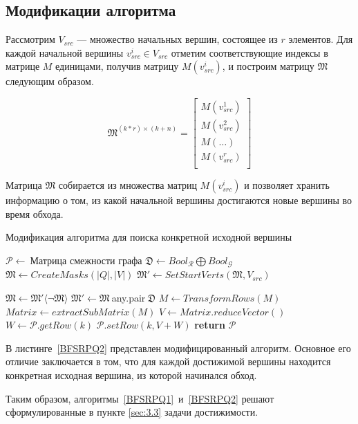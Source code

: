 \pagebreak

\subsection{Модификации алгоритма}

Рассмотрим $V_{src}$ --- множество начальных вершин, состоящее из $r$ элементов. Для каждой начальной вершины $v_{src}^i \in V_{src}$ отметим соответствующие индексы в матрице $M$ единицами, получив матрицу $M(v_{src}^i)$,  и построим матрицу $\mathfrak{M}$ следующим образом.

\begin{equation}
\mathfrak{M}^{(k*r) \times (k + n)} =
  \left[
    \begin{matrix}
        M(v_{src}^1) \\
        M(v_{src}^2) \\ 
        M(\dots) \\
        M(v_{src}^r) \\
    \end{matrix}
  \right]
\end{equation}

Матрица $\mathfrak{M}$ собирается из множества матриц $M(v_{src}^i)$ и позволяет хранить информацию о том, из какой начальной вершины достигаются новые вершины во время обхода. 

\begin{algorithm}[t]
  \caption{Модификация алгоритма для поиска конкретной исходной вершины}\label{BFSRPQ2}
  \begin{algorithmic}[1]
    \State $\mathcal{P}\gets~${Матрица смежности графа}
    \State $\mathfrak{D}\gets Bool_\mathcal{R} \bigoplus Bool_\mathcal{G}$
    \State $\mathfrak{M}\gets CreateMasks(|Q|,|V|)$
    \State $\mathfrak{M}'\gets SetStartVerts(\mathfrak{M}, V_{src})$  
    
      \State $\mathfrak{M}\gets \mathfrak{M}'\langle\neg\mathfrak{M}\rangle$
        \State $\mathfrak{M}'\gets \mathfrak{M}~$any.pair$~\mathfrak{D}$
            \State $M\gets TransformRows(M)$
        \EndFor
      \EndFor
        \State $Matrix\gets extractSubMatrix(M)$
        \State $V\gets Matrix.reduceVector()$
        \State $W\gets\mathcal{P}.getRow(k)$
        \State $\mathcal{P}.setRow(k, V+W)$
      \EndFor
    \EndWhile
    \State \textbf{return} $\mathcal{P}$
    \EndProcedure
  \end{algorithmic}
\end{algorithm}

В листинге~\ref{BFSRPQ2} представлен модифицированный алгоритм. Основное его отличие заключается в том, что для каждой достижимой вершины находится конкретная исходная вершина, из которой начинался обход.

Таким образом, алгоритмы~\ref{BFSRPQ1}~и~\ref{BFSRPQ2} решают сформулированные в пункте \ref{sec:3.3} задачи достижимости.

